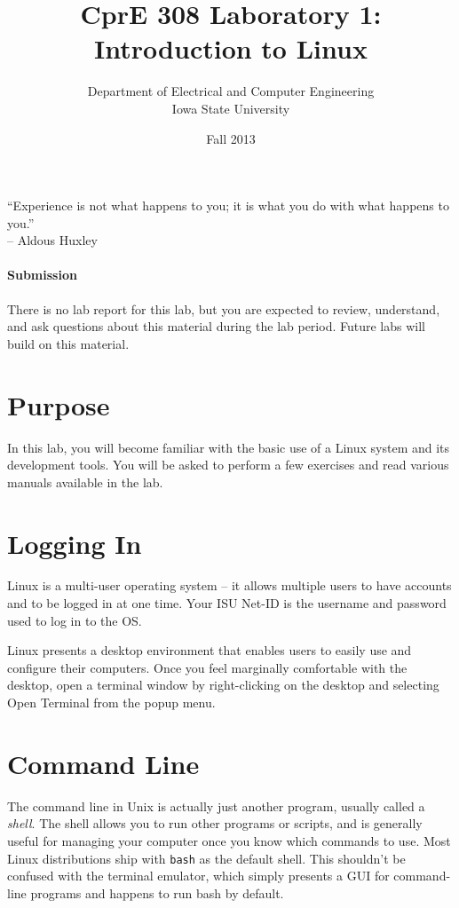 \documentclass[letterpaper,10pt]{article}
\title{CprE 308 Laboratory 1: Introduction to Linux}
\author{Department of Electrical and Computer Engineering \\ Iowa State University}
\date{Fall 2013}
\newcommand{\cmd}[1]{\texttt{#1}}
\begin{document}
\maketitle

``Experience is not what happens to you; it is what you do with what happens to you.''\\ -- Aldous Huxley

\paragraph{Submission}
There is no lab report for this lab, but you are expected to review, understand, and ask questions about this material during the lab period. Future labs will build on this material.

\section{Purpose}
In this lab, you will become familiar with the basic use of a Linux system and its development tools. You will be asked to perform a few exercises and read various manuals available in the lab.

\section{Logging In}
Linux is a multi-user operating system -- it allows multiple users to have accounts and to be logged in at one time.
Your ISU Net-ID is the username and password used to log in to the OS.

Linux presents a desktop environment that enables users to easily use and configure their computers. Once you feel marginally comfortable with the desktop, open a terminal window by right-clicking on the desktop and selecting Open Terminal from the popup menu.

\section{Command Line}
The command line in Unix is actually just another program, usually called a \emph{shell}. The shell allows you to run other programs or scripts, and is generally useful for managing your computer once you know which commands to use. Most Linux distributions ship with \cmd{bash} as the default shell. This shouldn't be confused with the terminal emulator, which simply presents a GUI for command-line programs and happens to run bash by default.
\end{document}
